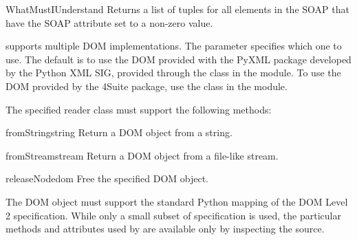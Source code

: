 \begin{methoddesc}{WhatMustIUnderstand}{}
Returns a list of  tuples for all elements in the
SOAP  that have the SOAP  attribute set
to a non-zero value.
\end{methoddesc}

\ZSI{} supports multiple DOM implementations.
The  parameter specifies which one to use.
The default is to use the DOM provided with the PyXML package developed
by the Python XML SIG, provided through the  class
in the  module.
To use the  DOM provided by the 4Suite package, use the
 class in the  module.

The specified reader class must support the following methods:

\begin{methoddesc}{fromString}{string}
Return a DOM object from a string.
\end{methoddesc}

\begin{methoddesc}{fromStream}{stream}
Return a DOM object from a file-like stream.
\end{methoddesc}

\begin{methoddesc}{releaseNode}{dom}
Free the specified DOM object.
\end{methoddesc}

The DOM object must support the standard Python mapping of the DOM Level 2
specification.
While only a small subset of specification is used, the particular
methods and attributes used by \ZSI{} are available only
by inspecting the source.
